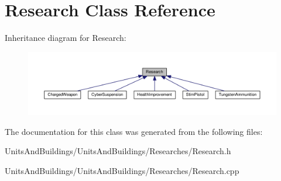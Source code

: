 \hypertarget{class_research}{}\section{Research Class Reference}
\label{class_research}


Inheritance diagram for Research\+:
\nopagebreak
\begin{figure}[H]
\begin{center}
\leavevmode
\includegraphics[width=350pt]{class_research__inherit__graph}
\end{center}
\end{figure}


The documentation for this class was generated from the following files\+:\begin{DoxyCompactItemize}
\item 
Units\+And\+Buildings/\+Units\+And\+Buildings/\+Researches/Research.\+h\item 
Units\+And\+Buildings/\+Units\+And\+Buildings/\+Researches/Research.\+cpp\end{DoxyCompactItemize}
